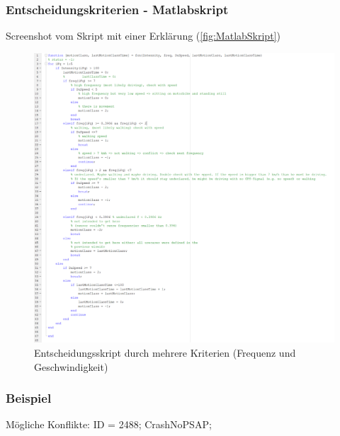 \subsubsection{Entscheidungskriterien - Matlabskript}
%
%
%
%
%
Screenshot vom Skript mit einer Erklärung (\autoref{fig:MatlabSkript}) %
\begin{figure}[H]
	\centering
	\includegraphics[width=\linewidth]{Bilder/MatlabSkript.png}
	\caption{Entscheidungsskript durch mehrere Kriterien (Frequenz und Geschwindigkeit)}
	\label{fig:MatlabSkript}
\end{figure}




\subsubsection{Beispiel}
Mögliche Konflikte: ID = 2488; CrashNoPSAP;\\

